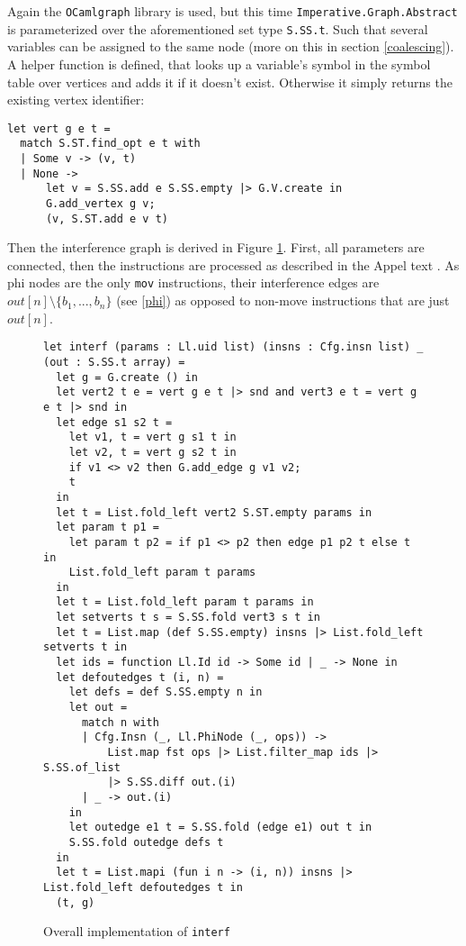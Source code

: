 \documentclass{article}
\begin{document}
Again the \texttt{OCamlgraph} library is used, but this time \texttt{Imperative.Graph.Abstract} is parameterized over the aforementioned set type \texttt{S.SS.t}. %
Such that several variables can be assigned to the same node (more on this in section \ref{coalescing}). A helper function is defined, that looks up a variable's symbol in the symbol table over vertices and adds it if it doesn't exist. Otherwise it simply returns the existing vertex identifier:
\begin{verbatim}
let vert g e t =
  match S.ST.find_opt e t with
  | Some v -> (v, t)
  | None ->
      let v = S.SS.add e S.SS.empty |> G.V.create in
      G.add_vertex g v;
      (v, S.ST.add e v t)
\end{verbatim}
Then the interference graph is derived in Figure \ref{fig:interf}. First, all parameters are connected, then the instructions are processed as described in the Appel text \cite[222]{tiger}. As phi nodes are the only \texttt{mov} instructions, their interference edges are   \(\mathit{out}[n] \setminus \{b_1, ..., b_n\}\) (see \eqref{phi}) as opposed to  non-move instructions that are just \(\mathit{out}[n]\).

\begin{figure}[H]
\begin{verbatim}
let interf (params : Ll.uid list) (insns : Cfg.insn list) _ (out : S.SS.t array) =
  let g = G.create () in
  let vert2 t e = vert g e t |> snd and vert3 e t = vert g e t |> snd in
  let edge s1 s2 t =
    let v1, t = vert g s1 t in
    let v2, t = vert g s2 t in
    if v1 <> v2 then G.add_edge g v1 v2;
    t
  in
  let t = List.fold_left vert2 S.ST.empty params in
  let param t p1 =
    let param t p2 = if p1 <> p2 then edge p1 p2 t else t in
    List.fold_left param t params
  in
  let t = List.fold_left param t params in
  let setverts t s = S.SS.fold vert3 s t in
  let t = List.map (def S.SS.empty) insns |> List.fold_left setverts t in
  let ids = function Ll.Id id -> Some id | _ -> None in
  let defoutedges t (i, n) =
    let defs = def S.SS.empty n in
    let out =
      match n with
      | Cfg.Insn (_, Ll.PhiNode (_, ops)) ->
          List.map fst ops |> List.filter_map ids |> S.SS.of_list
          |> S.SS.diff out.(i)
      | _ -> out.(i)
    in
    let outedge e1 t = S.SS.fold (edge e1) out t in
    S.SS.fold outedge defs t
  in
  let t = List.mapi (fun i n -> (i, n)) insns |> List.fold_left defoutedges t in
  (t, g)
\end{verbatim}
\caption{Overall implementation of \texttt{interf}\label{fig:interf}}
\end{figure}
\end{document}
